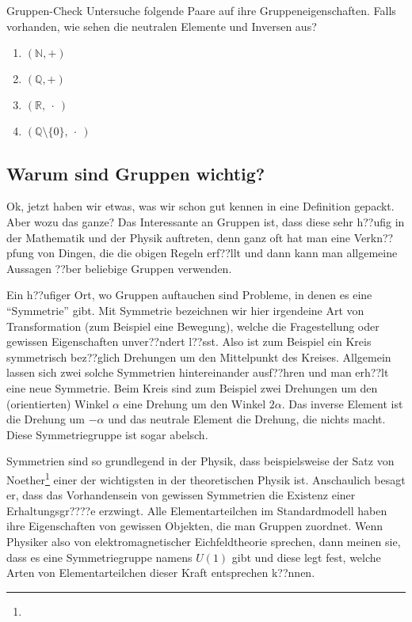 \documentclass[a4paper,ngerman,12pt]{zirkelblatt1415}
\theoremstyle{definition}
\theoremstyle{plain}
\theoremstyle{remark}
\begin{document}
\begin{aufgabe}{Gruppen-Check}
Untersuche folgende Paare auf ihre Gruppeneigenschaften. Falls vorhanden, wie sehen die neutralen Elemente und Inversen aus?
\begin{enumerate}
\item $(\mathbb{N}, +)$
\item $(\mathbb{Q}, +)$
\item $(\mathbb{R},\ \cdot\ )$
\item $(\mathbb{Q}\setminus \{0\},\ \cdot\ )$
\end{enumerate}
\end{aufgabe}

\subsection{Warum sind Gruppen wichtig?}

Ok, jetzt haben wir etwas, was wir schon gut kennen in eine Definition gepackt. Aber wozu das ganze? Das Interessante an Gruppen ist, dass diese sehr h??ufig in der Mathematik und der Physik auftreten, denn ganz oft hat man eine Verkn??pfung von Dingen, die die obigen Regeln erf??llt und dann kann man allgemeine Aussagen ??ber beliebige Gruppen verwenden.

Ein h??ufiger Ort, wo Gruppen auftauchen sind Probleme, in denen es eine "`Symmetrie"' gibt. Mit Symmetrie bezeichnen wir hier irgendeine Art von Transformation (zum Beispiel eine Bewegung), welche die Fragestellung oder gewissen Eigenschaften unver??ndert l??sst. Also ist zum Beispiel ein Kreis symmetrisch bez??glich Drehungen um den Mittelpunkt des Kreises. Allgemein lassen sich zwei solche Symmetrien hintereinander ausf??hren und man erh??lt eine neue Symmetrie. Beim Kreis sind zum Beispiel zwei Drehungen um den (orientierten) Winkel $\alpha$ eine Drehung um den Winkel $2\alpha$. Das inverse Element ist die Drehung um $-\alpha$ und das neutrale Element die Drehung, die nichts macht. Diese Symmetriegruppe ist sogar abelsch.

Symmetrien sind so grundlegend in der Physik, dass beispielsweise der Satz von Noether\footnote{} einer der wichtigsten in der theoretischen Physik ist. Anschaulich besagt er, dass das Vorhandensein von gewissen Symmetrien die Existenz einer Erhaltungsgr????e erzwingt. Alle Elementarteilchen im Standardmodell haben ihre Eigenschaften von gewissen Objekten, die man Gruppen zuordnet. Wenn Physiker also von elektromagnetischer Eichfeldtheorie sprechen, dann meinen sie, dass es eine Symmetriegruppe namens $U(1)$ gibt und diese legt fest, welche Arten von Elementarteilchen dieser Kraft entsprechen k??nnen.
\end{document}
